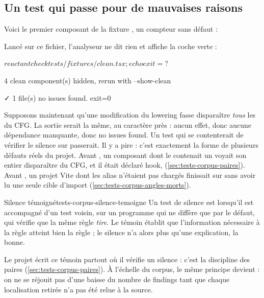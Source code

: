 \subsection{Un test qui passe pour de mauvaises raisons}

Voici le premier composant de la fixture , un compteur sans défaut :


Lancé sur ce fichier, l'analyseur ne dit rien et affiche la coche verte :

\begin{shell}
$ reactant check tests/fixtures/clean.tsx ; echo exit=$?
\end{shell}
\begin{sortie}
   4 clean component(s) hidden, rerun with --show-clean

✓  1 file(s) no issues found.
exit=0
\end{sortie}

Supposons maintenant qu'une modification du lowering fasse disparaître \emph{tous} les  du CFG. La sortie serait la même, au caractère près : aucun effet, donc aucune dépendance manquante, donc \og no issues found\fg{}. Un test qui se contenterait de vérifier le silence sur  passerait. Il y a pire : c'est exactement la forme de plusieurs défauts réels du projet. Avant , un composant dont le  contenait un  voyait son  entier disparaître du CFG, et il était déclaré  hook, \fg{} (\cref{sec:tests-corpus-paires}). Avant , un projet Vite dont les alias n'étaient pas chargés finissait sur \og {}\fg{} sans avoir lu une seule cible d'import (\cref{sec:tests-corpus-angles-morts}).

\begin{definition}{Silence témoigné}{tests-corpus-silence-temoigne}
Un test de silence est  lorsqu'il est accompagné d'un test voisin, sur un programme qui ne diffère que par le défaut, qui vérifie que la même règle \emph{tire}. Le témoin établit que l'information nécessaire à la règle atteint bien la règle ; le silence n'a alors plus qu'une explication, la bonne.
\end{definition}

Le projet écrit ce témoin partout où il vérifie un silence : c'est la \og discipline des paires\fg{} (\cref{sec:tests-corpus-paires}). À l'échelle du corpus, le même principe devient : on ne se réjouit pas d'une baisse du nombre de findings tant que chaque localisation retirée n'a pas été relue à la source.


